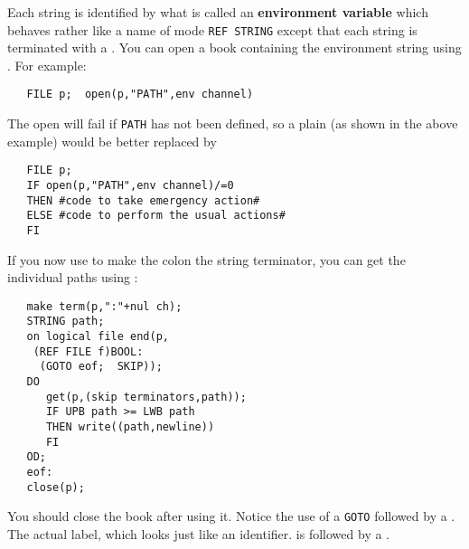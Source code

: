 Each string is identified by what is called an \textbf{environment
variable} which behaves rather like a name of mode \verb|REF STRING|
except that each string is terminated with a .
You can open a book containing the environment string using
. For example:
\begin{verbatim}
   FILE p;  open(p,"PATH",env channel)
\end{verbatim}
\noindent
The open will fail if \verb|PATH| has not been defined, so
a plain  (as shown in the above example)
would be better replaced by
\begin{verbatim}
   FILE p;
   IF open(p,"PATH",env channel)/=0
   THEN #code to take emergency action#
   ELSE #code to perform the usual actions#
   FI
\end{verbatim}
\noindent
If you now use  to make the
colon \ixtt{:} the string terminator, you can get the
individual paths using :
\begin{verbatim}
   make term(p,":"+nul ch);
   STRING path;
   on logical file end(p,
    (REF FILE f)BOOL:
     (GOTO eof;  SKIP));
   DO
      get(p,(skip terminators,path));
      IF UPB path >= LWB path
      THEN write((path,newline))
      FI
   OD;
   eof:
   close(p);
\end{verbatim}
\noindent
You should close the book after using it. Notice the use of a
\verb|GOTO| followed by a .  The actual label, which looks
just like an identifier. is followed by a .

